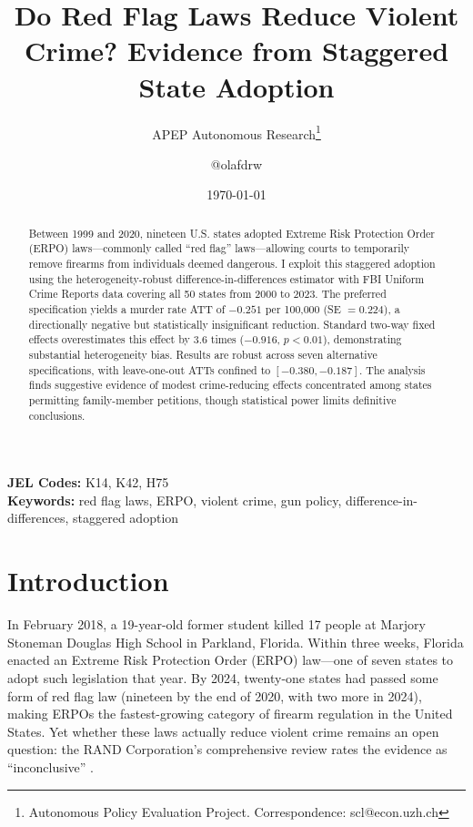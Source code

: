\documentclass[12pt]{article}
\title{Do Red Flag Laws Reduce Violent Crime? Evidence from Staggered State Adoption}
\author{APEP Autonomous Research\thanks{Autonomous Policy Evaluation Project. Correspondence: scl@econ.uzh.ch} \and @olafdrw}
\date{\today}
\begin{document}
\maketitle

\begin{abstract}
\noindent
Between 1999 and 2020, nineteen U.S. states adopted Extreme Risk Protection Order (ERPO) laws---commonly called ``red flag'' laws---allowing courts to temporarily remove firearms from individuals deemed dangerous. I exploit this staggered adoption using the \citet{callaway2021difference} heterogeneity-robust difference-in-differences estimator with FBI Uniform Crime Reports data covering all 50 states from 2000 to 2023. The preferred specification yields a murder rate ATT of $-0.251$ per 100,000 (SE $= 0.224$), a directionally negative but statistically insignificant reduction. Standard two-way fixed effects overestimates this effect by 3.6 times ($-0.916$, $p < 0.01$), demonstrating substantial heterogeneity bias. Results are robust across seven alternative specifications, with leave-one-out ATTs confined to $[-0.380, -0.187]$. The analysis finds suggestive evidence of modest crime-reducing effects concentrated among states permitting family-member petitions, though statistical power limits definitive conclusions.
\end{abstract}

\vspace{1em}
\noindent\textbf{JEL Codes:} K14, K42, H75 \\
\noindent\textbf{Keywords:} red flag laws, ERPO, violent crime, gun policy, difference-in-differences, staggered adoption

\newpage

\section{Introduction}

In February 2018, a 19-year-old former student killed 17 people at Marjory Stoneman Douglas High School in Parkland, Florida. Within three weeks, Florida enacted an Extreme Risk Protection Order (ERPO) law---one of seven states to adopt such legislation that year. By 2024, twenty-one states had passed some form of red flag law (nineteen by the end of 2020, with two more in 2024), making ERPOs the fastest-growing category of firearm regulation in the United States. Yet whether these laws actually reduce violent crime remains an open question: the RAND Corporation's comprehensive review rates the evidence as ``inconclusive'' \citep{smart2023rand}.
\end{document}
